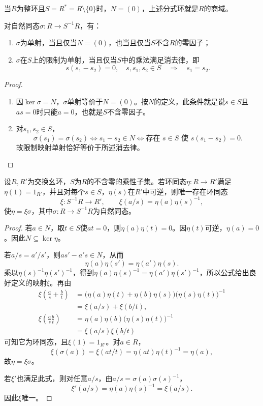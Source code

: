 当$R$为整环且$S=R^*=R\setminus\{0\}$时，$N=(0)$，上述分式环就是$R$的商域。

\begin{proposition}
对自然同态$\sigma:R\to S^{-1}R$，有：
\begin{enumerate}
\item $\sigma$为单射，当且仅当$N=(0)$，也当且仅当$S$不含$R$的零因子；
\item $\sigma$在$S$上的限制为单射，当且仅当$S$中的乘法满足消去律，即
\[
s(s_1-s_2)=0,\quad s,s_1,s_2\in S
\quad\Longrightarrow\quad s_1=s_2.
\]
\end{enumerate}
\end{proposition}
\begin{proof}
\begin{enumerate}
\item 因$\ker\sigma=N$，$\sigma$单射等价于$N=(0)$。按$N$的定义，此条件就是说$s\in S$且$as=0$时只能$a=0$，也就是$S$不含零因子。
\item 对$s_1,s_2\in S$，
\[
\sigma(s_1)=\sigma(s_2)
\Longleftrightarrow s_1-s_2\in N
\Longleftrightarrow \text{存在 }s\in S\text{ 使 }s(s_1-s_2)=0.
\]
故限制映射单射恰好等价于所述消去律。
\end{enumerate}
\end{proof}

\begin{theorem}\label{p2:localization-universal}
设$R,R'$为交换幺环，$S$为$R$的不含零的乘性子集。若环同态$\eta:R\to R'$满足$\eta(1)=1_{R'}$，并且对每个$s\in S$，$\eta(s)$在$R'$中可逆，则唯一存在环同态
\[
\xi:S^{-1}R\to R',\qquad \xi(a/s)=\eta(a)\eta(s)^{-1},
\]
使$\eta=\xi\sigma$，其中$\sigma:R\to S^{-1}R$为自然同态。
\end{theorem}
\begin{proof}
若$a\in N$，取$t\in S$使$at=0$，则$\eta(a)\eta(t)=0$。因$\eta(t)$可逆，$\eta(a)=0$。因此$N\subseteq\ker\eta$。

若$a/s=a'/s'$，则$as'-a's\in N$，从而
\[
\eta(a)\eta(s')=\eta(a')\eta(s).
\]
乘以$\eta(s)^{-1}\eta(s')^{-1}$，得到$\eta(a)\eta(s)^{-1}=\eta(a')\eta(s')^{-1}$，所以公式给出良好定义的映射$\xi$。再由
\begin{align*}
\xi\left(\frac as+\frac bt\right)
&=\bigl(\eta(a)\eta(t)+\eta(b)\eta(s)\bigr)
  \bigl(\eta(s)\eta(t)\bigr)^{-1}\\
&=\xi(a/s)+\xi(b/t),\\
\xi\left(\frac as\frac bt\right)
&=\eta(a)\eta(b)\bigl(\eta(s)\eta(t)\bigr)^{-1}\\
&=\xi(a/s)\xi(b/t)
\end{align*}
可知它为环同态，且$\xi(1)=1_{R'}$。对$a\in R$，
\[
\xi(\sigma(a))=\xi(at/t)=\eta(at)\eta(t)^{-1}=\eta(a),
\]
故$\eta=\xi\sigma$。

若$\xi'$也满足此式，则对任意$a/s$，由$a/s=\sigma(a)\sigma(s)^{-1}$，
\[
\xi'(a/s)=\eta(a)\eta(s)^{-1}=\xi(a/s).
\]
因此$\xi$唯一。
\end{proof}

